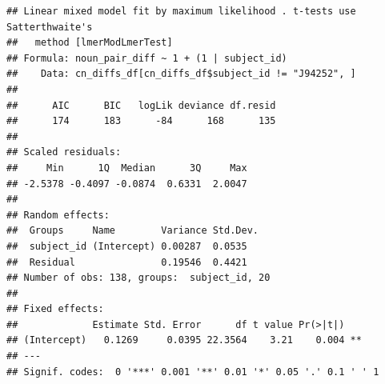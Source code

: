 \documentclass[
  doc,floatsintext]{apa6}
\newenvironment{Shaded}{\begin{snugshade}}{\end{snugshade}}
\newcommand{\AttributeTok}[1]{\textcolor[rgb]{0.13,0.29,0.53}{#1}}
\newcommand{\CommentTok}[1]{\textcolor[rgb]{0.56,0.35,0.01}{\textit{#1}}}
\newcommand{\ConstantTok}[1]{\textcolor[rgb]{0.56,0.35,0.01}{#1}}
\newcommand{\DecValTok}[1]{\textcolor[rgb]{0.00,0.00,0.81}{#1}}
\newcommand{\FunctionTok}[1]{\textcolor[rgb]{0.13,0.29,0.53}{\textbf{#1}}}
\newcommand{\NormalTok}[1]{#1}
\newcommand{\OtherTok}[1]{\textcolor[rgb]{0.56,0.35,0.01}{#1}}
\newcommand{\SpecialCharTok}[1]{\textcolor[rgb]{0.81,0.36,0.00}{\textbf{#1}}}
\newcommand{\StringTok}[1]{\textcolor[rgb]{0.31,0.60,0.02}{#1}}
\begin{document}
\begin{Shaded}
\end{Shaded}

\begin{verbatim}
## Linear mixed model fit by maximum likelihood . t-tests use Satterthwaite's
##   method [lmerModLmerTest]
## Formula: noun_pair_diff ~ 1 + (1 | subject_id)
##    Data: cn_diffs_df[cn_diffs_df$subject_id != "J94252", ]
## 
##      AIC      BIC   logLik deviance df.resid 
##      174      183      -84      168      135 
## 
## Scaled residuals: 
##     Min      1Q  Median      3Q     Max 
## -2.5378 -0.4097 -0.0874  0.6331  2.0047 
## 
## Random effects:
##  Groups     Name        Variance Std.Dev.
##  subject_id (Intercept) 0.00287  0.0535  
##  Residual               0.19546  0.4421  
## Number of obs: 138, groups:  subject_id, 20
## 
## Fixed effects:
##             Estimate Std. Error      df t value Pr(>|t|)   
## (Intercept)   0.1269     0.0395 22.3564    3.21    0.004 **
## ---
## Signif. codes:  0 '***' 0.001 '**' 0.01 '*' 0.05 '.' 0.1 ' ' 1
\end{verbatim}
\end{document}
